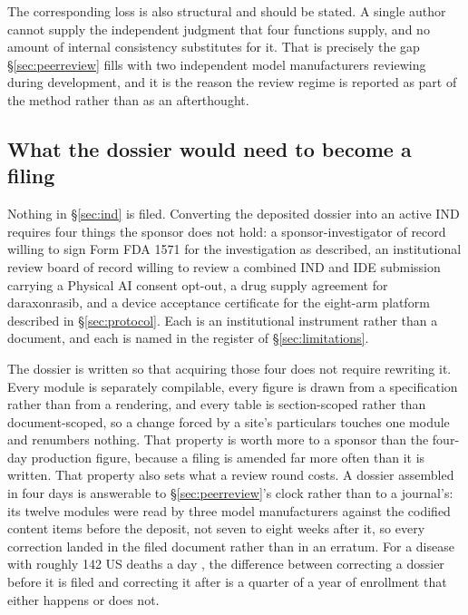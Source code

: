 The corresponding loss is also structural and should be stated. A single author
cannot supply the independent judgment that four functions supply, and no amount
of internal consistency substitutes for it. That is precisely the gap
\S\ref{sec:peerreview} fills with two independent model manufacturers reviewing
during development, and it is the reason the review regime is reported as part
of the method rather than as an afterthought.

\subsection{What the dossier would need to become a filing}

Nothing in \S\ref{sec:ind} is filed. Converting the deposited dossier into an
active IND requires four things the sponsor does not hold: a sponsor-investigator
of record willing to sign Form FDA 1571 for the investigation as described, an
institutional review board of record willing to review a combined IND and IDE
submission carrying a Physical AI consent opt-out, a drug supply agreement for
daraxonrasib, and a device acceptance certificate for the eight-arm platform
described in \S\ref{sec:protocol}. Each is an institutional instrument rather
than a document, and each is named in the register of \S\ref{sec:limitations}.

The dossier is written so that acquiring those four does not require rewriting
it. Every module is separately compilable, every figure is drawn from a
specification rather than from a rendering, and every table is section-scoped
rather than document-scoped, so a change forced by a site's particulars touches
one module and renumbers nothing. That property is worth more to a sponsor than
the four-day production figure, because a filing is amended far more often than
it is written.
That property also sets what a review round costs. A dossier assembled in four
days is answerable to \S\ref{sec:peerreview}'s clock rather than to a journal's:
its twelve modules were read by three model manufacturers against the codified
content items before the deposit, not seven to eight weeks after it, so every
correction landed in the filed document rather than in an erratum. For a disease
with roughly 142 US deaths a day \cite{siegel2025statistics}, the difference
between correcting a dossier before it is filed and correcting it after is a
quarter of a year of enrollment that either happens or does not.
